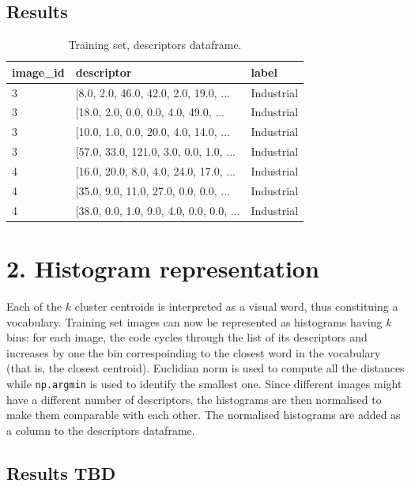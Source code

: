 \documentclass[12pt]{article}
\begin{document}
  \subsection*{Results}

	\begin{table}[H] 
		\centering
		\caption*{Training set, descriptors dataframe.}
		\begin{tabular}{lll}
			\toprule
      image\_id & descriptor & label \\
      \midrule
      3 &  [8.0, 2.0, 46.0, 42.0, 2.0, 19.0, ...    &  Industrial \\
      3 &  [18.0, 2.0, 0.0, 0.0, 4.0, 49.0, ...     &  Industrial \\
      3 &  [10.0, 1.0, 0.0, 20.0, 4.0, 14.0, ...    &  Industrial \\
      3 &  [57.0, 33.0, 121.0, 3.0, 0.0, 1.0, ...   &  Industrial \\
      4 &  [16.0, 20.0, 8.0, 4.0, 24.0, 17.0, ...   &  Industrial \\
      4 &  [35.0, 9.0, 11.0, 27.0, 0.0, 0.0, ...    &  Industrial \\
      4 &  [38.0, 0.0, 1.0, 9.0, 4.0, 0.0, 0.0, ... &  Industrial \\
			\bottomrule
		\end{tabular}
	\end{table}



  \section*{2. Histogram representation}

  Each of the \( k \) cluster centroids is interpreted as a visual word, thus constituing a vocabulary. Training set images can now be represented as histograms having \( k \) bins: for each image, the code cycles through the list of its descriptors and increases by one the bin correspoinding to the closest word in the vocabulary (that is, the closest centroid). Euclidian norm is used to compute all the distances while \texttt{np.argmin} is used to identify the smallest one. Since different images might have a different number of descriptors, the histograms are then normalised to make them comparable with each other. The normalised histograms are added as a column to the descriptors dataframe.

  \subsection*{Results TBD}
\end{document}
